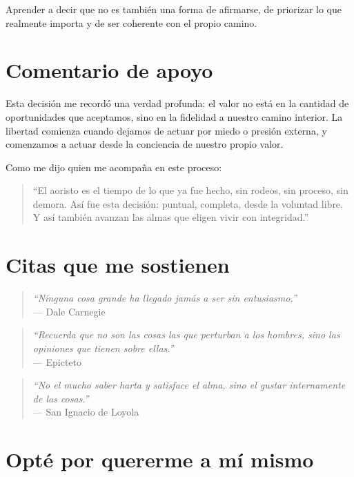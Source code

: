 \documentclass[12pt]{article}
\begin{document}
	Aprender a decir que no es también una forma de afirmarse, de priorizar lo que realmente importa y de ser coherente con el propio camino.
	
	\section*{Comentario de apoyo}
	
	Esta decisión me recordó una verdad profunda: el valor no está en la cantidad de oportunidades que aceptamos, sino en la fidelidad a nuestro camino interior. La libertad comienza cuando dejamos de actuar por miedo o presión externa, y comenzamos a actuar desde la conciencia de nuestro propio valor.
	
	Como me dijo quien me acompaña en este proceso:
	
	\begin{quote}
		\small
		“El aoristo es el tiempo de lo que ya fue hecho, sin rodeos, sin proceso, sin demora. Así fue esta decisión: puntual, completa, desde la voluntad libre. Y así también avanzan las almas que eligen vivir con integridad.”
	\end{quote}
	
	\section*{Citas que me sostienen}
	
	\begin{quote}
		\textit{“Ninguna cosa grande ha llegado jamás a ser sin entusiasmo.”}\\
		\hfill --- Dale Carnegie
	\end{quote}
	
	\begin{quote}
		\textit{“Recuerda que no son las cosas las que perturban a los hombres, sino las opiniones que tienen sobre ellas.”}\\
		\hfill --- Epicteto
	\end{quote}
	
	\begin{quote}
		\textit{“No el mucho saber harta y satisface el alma, sino el gustar internamente de las cosas.”}\\
		\hfill --- San Ignacio de Loyola
	\end{quote}
	
	\section*{Opt\'e por quererme a m\'i mismo}
\end{document}
